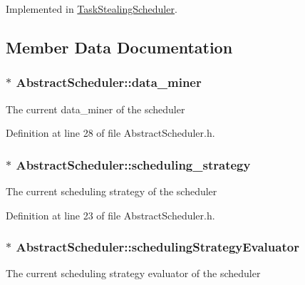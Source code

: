 Implemented in \hyperlink{class_task_stealing_scheduler_a362edbac4a417c08ee8b19a364cc97bb}{Task\+Stealing\+Scheduler}.



\subsection{Member Data Documentation}
\hypertarget{class_abstract_scheduler_a6e281d90fa4b965779cd13eabf7d0249}{}
\subsubsection[{data\+\_\+miner}]{$\ast$ Abstract\+Scheduler\+::data\+\_\+miner\hspace{0.3cm}{\ttfamily [protected]}}\label{class_abstract_scheduler_a6e281d90fa4b965779cd13eabf7d0249}
The current data\+\_\+miner of the scheduler 

Definition at line 28 of file Abstract\+Scheduler.\+h.

\hypertarget{class_abstract_scheduler_a7dd11eee79bfb44c820d6c28480fd0c7}{}
\subsubsection[{scheduling\+\_\+strategy}]{$\ast$ Abstract\+Scheduler\+::scheduling\+\_\+strategy\hspace{0.3cm}{\ttfamily [protected]}}\label{class_abstract_scheduler_a7dd11eee79bfb44c820d6c28480fd0c7}
The current scheduling strategy of the scheduler 

Definition at line 23 of file Abstract\+Scheduler.\+h.

\hypertarget{class_abstract_scheduler_a5f95e61e03441ca92c6ba8f434be7fe0}{}
\subsubsection[{scheduling\+Strategy\+Evaluator}]{$\ast$ Abstract\+Scheduler\+::scheduling\+Strategy\+Evaluator\hspace{0.3cm}{\ttfamily [protected]}}\label{class_abstract_scheduler_a5f95e61e03441ca92c6ba8f434be7fe0}
The current scheduling strategy evaluator of the scheduler 

